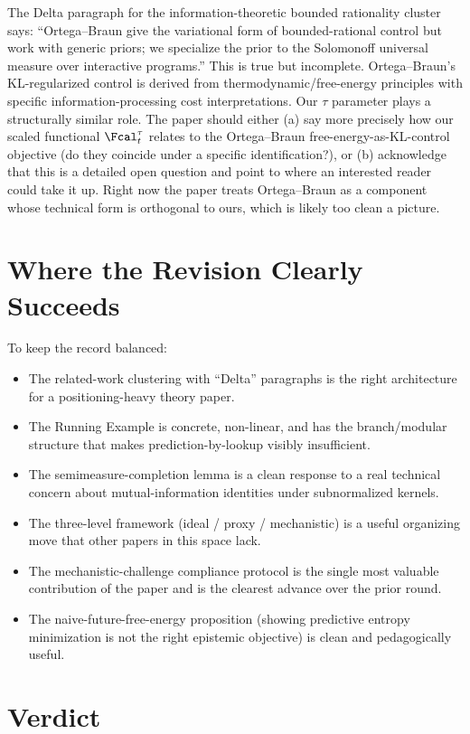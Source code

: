 \documentclass[11pt]{article}
\begin{document}
The Delta paragraph for the information-theoretic bounded rationality cluster says: ``Ortega--Braun give the variational form of bounded-rational control but work with generic priors; we specialize the prior to the Solomonoff universal measure over interactive programs.'' This is true but incomplete. Ortega--Braun's KL-regularized control is derived from thermodynamic/free-energy principles with specific information-processing cost interpretations. Our $\tau$ parameter plays a structurally similar role. The paper should either (a) say more precisely how our scaled functional $\Fcal_t^\tau$ relates to the Ortega--Braun free-energy-as-KL-control objective (do they coincide under a specific identification?), or (b) acknowledge that this is a detailed open question and point to where an interested reader could take it up. Right now the paper treats Ortega--Braun as a component whose technical form is orthogonal to ours, which is likely too clean a picture.

\section*{Where the Revision Clearly Succeeds}

To keep the record balanced:

\begin{itemize}
\item The related-work clustering with ``Delta'' paragraphs is the right architecture for a positioning-heavy theory paper.
\item The Running Example is concrete, non-linear, and has the branch/modular structure that makes prediction-by-lookup visibly insufficient.
\item The semimeasure-completion lemma is a clean response to a real technical concern about mutual-information identities under subnormalized kernels.
\item The three-level framework (ideal / proxy / mechanistic) is a useful organizing move that other papers in this space lack.
\item The mechanistic-challenge compliance protocol is the single most valuable contribution of the paper and is the clearest advance over the prior round.
\item The naive-future-free-energy proposition (showing predictive entropy minimization is not the right epistemic objective) is clean and pedagogically useful.
\end{itemize}

\section*{Verdict}
\end{document}
